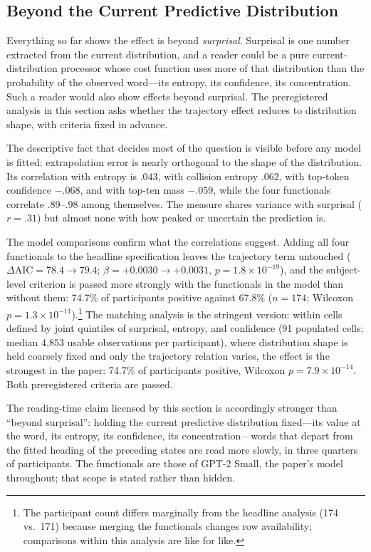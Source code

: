 \documentclass[12pt]{article}
\newcommand{\new}[1]{#1}   %
\begin{document}
\new{\subsection{Beyond the Current Predictive Distribution}\label{sec:distsuff}

Everything so far shows the effect is beyond \emph{surprisal}. Surprisal is one number extracted from the current distribution, and a reader could be a pure current-distribution processor whose cost function uses more of that distribution than the probability of the observed word---its entropy, its confidence, its concentration. Such a reader would also show effects beyond surprisal. The preregistered analysis in this section asks whether the trajectory effect reduces to distribution shape, with criteria fixed in advance.

The descriptive fact that decides most of the question is visible before any model is fitted: extrapolation error is nearly orthogonal to the shape of the distribution. Its correlation with entropy is $.043$, with collision entropy $.062$, with top-token confidence $-.068$, and with top-ten mass $-.059$, while the four functionals correlate $.89$--$.98$ among themselves. The measure shares variance with surprisal ($r = .31$) but almost none with how peaked or uncertain the prediction is.

The model comparisons confirm what the correlations suggest. Adding all four functionals to the headline specification leaves the trajectory term untouched ($\Delta\text{AIC} = 78.4 \rightarrow 79.4$; $\beta = +0.0030 \rightarrow +0.0031$, $p = 1.8 \times 10^{-19}$), and the subject-level criterion is passed more strongly with the functionals in the model than without them: 74.7\% of participants positive against 67.8\% ($n = 174$; Wilcoxon $p = 1.3 \times 10^{-11}$).\footnote{The participant count differs marginally from the headline analysis (174 vs.\ 171) because merging the functionals changes row availability; comparisons within this analysis are like for like.} The matching analysis is the stringent version: within cells defined by joint quintiles of surprisal, entropy, and confidence (91 populated cells; median 4,853 usable observations per participant), where distribution shape is held coarsely fixed and only the trajectory relation varies, the effect is the strongest in the paper: 74.7\% of participants positive, Wilcoxon $p = 7.9 \times 10^{-14}$. Both preregistered criteria are passed.

The reading-time claim licensed by this section is accordingly stronger than ``beyond surprisal'': holding the current predictive distribution fixed---its value at the word, its entropy, its confidence, its concentration---words that depart from the fitted heading of the preceding states are read more slowly, in three quarters of participants. The functionals are those of GPT-2 Small, the paper's model throughout; that scope is stated rather than hidden.}
\end{document}
